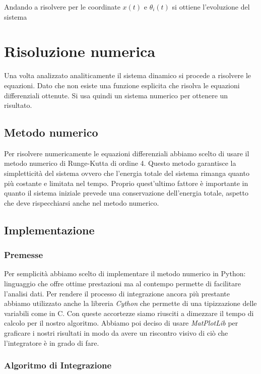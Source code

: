 \documentclass[12pt]{article}
\begin{document}
Andando a risolvere per le coordinate $x(t)$ e $\theta_i(t)$ si ottiene l'evoluzione del sistema

\section{Risoluzione numerica}

Una volta analizzato analiticamente il sistema dinamico si procede a risolvere le equazioni. Dato che non esiste una funzione esplicita che risolva le equazioni differenziali ottenute. Si usa quindi un sistema numerico per ottenere un risultato.

\subsection{Metodo numerico}

Per risolvere numericamente le equazioni differenziali abbiamo scelto di usare il metodo numerico di Runge-Kutta di ordine 4. Questo metodo garantisce la simpletticità del sistema ovvero che l'energia totale del sistema rimanga quanto più costante e limitata nel tempo. Proprio quest'ultimo fattore è importante in quanto il sistema iniziale prevede una conservazione dell'energia totale, aspetto che deve rispecchiarsi anche nel metodo numerico.

\subsection{Implementazione}

\subsubsection{Premesse}

Per semplicità abbiamo scelto di implementare il metodo numerico in Python: linguaggio che offre ottime prestazioni ma al contempo permette di facilitare l'analisi dati. Per rendere il processo di integrazione ancora più prestante abbiamo utilizzato anche la libreria \textit{Cython} che permette di una tipizzazione delle variabili come in C. Con queste accortezze siamo riusciti a dimezzare il tempo di calcolo per il nostro algoritmo. Abbiamo poi deciso di usare \textit{MatPlotLib} per graficare i nostri risultati in modo da avere un riscontro visivo di ciò che l'integratore è in grado di fare.

\subsubsection{Algoritmo di Integrazione}
\end{document}
